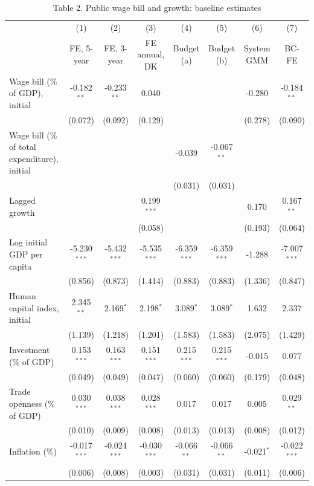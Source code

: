\begin{table}[htbp]\centering\footnotesize
\providecommand{\sym}[1]{\ensuremath{^{#1}}}
\caption{Table 2. Public wage bill and growth: baseline estimates}\label{tab:Table2_baseline}
\begin{tabular}{l*{7}{c}}
\toprule
 & (1) & (2) & (3) & (4) & (5) & (6) & (7) \\
 & FE, 5-year & FE, 3-year & FE annual, DK & Budget (a) & Budget (b) & System GMM & BC-FE \\
\midrule
Wage bill (\% of GDP), initial & -0.182\sym{**} & -0.233\sym{**} & 0.040 &  &  & -0.280 & -0.184\sym{**} \\
 & (0.072) & (0.092) & (0.129) &  &  & (0.278) & (0.090) \\
Wage bill (\% of total expenditure), initial &  &  &  & -0.039 & -0.067\sym{**} &  &  \\
 &  &  &  & (0.031) & (0.031) &  &  \\
Lagged growth &  &  & 0.199\sym{***} &  &  & 0.170 & 0.167\sym{**} \\
 &  &  & (0.058) &  &  & (0.193) & (0.064) \\
Log initial GDP per capita & -5.230\sym{***} & -5.432\sym{***} & -5.535\sym{***} & -6.359\sym{***} & -6.359\sym{***} & -1.288 & -7.007\sym{***} \\
 & (0.856) & (0.873) & (1.414) & (0.883) & (0.883) & (1.336) & (0.847) \\
Human capital index, initial & 2.345\sym{**} & 2.169\sym{*} & 2.198\sym{*} & 3.089\sym{*} & 3.089\sym{*} & 1.632 & 2.337 \\
 & (1.139) & (1.218) & (1.201) & (1.583) & (1.583) & (2.075) & (1.429) \\
Investment (\% of GDP) & 0.153\sym{***} & 0.163\sym{***} & 0.151\sym{***} & 0.215\sym{***} & 0.215\sym{***} & -0.015 & 0.077 \\
 & (0.049) & (0.049) & (0.047) & (0.060) & (0.060) & (0.179) & (0.048) \\
Trade openness (\% of GDP) & 0.030\sym{***} & 0.038\sym{***} & 0.028\sym{***} & 0.017 & 0.017 & 0.005 & 0.029\sym{**} \\
 & (0.010) & (0.009) & (0.008) & (0.013) & (0.013) & (0.008) & (0.012) \\
Inflation (\%) & -0.017\sym{***} & -0.024\sym{***} & -0.030\sym{***} & -0.066\sym{**} & -0.066\sym{**} & -0.021\sym{*} & -0.022\sym{***} \\
 & (0.006) & (0.008) & (0.003) & (0.031) & (0.031) & (0.011) & (0.006) \\

\end{tabular}
\end{table}
